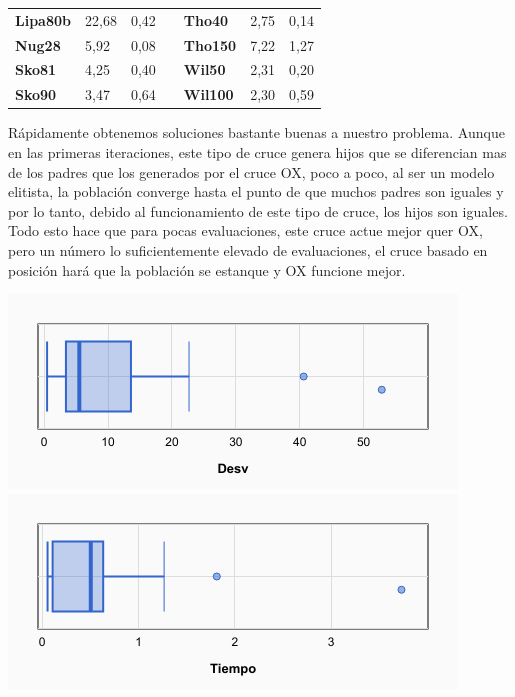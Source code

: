 \documentclass[a4paper, 12pt]{article}
\begin{document}
\begin{table}[H]
\begin{tabular}{|l|l|l|l|l|l|l|}
\textbf{Lipa80b}                    & 22,68                     & 0,42                        &                       & \textbf{Tho40}                     & 2,75                      & 0,14                        \\ \cline{1-3} \cline{5-7} 
\textbf{Nug28}                      & 5,92                      & 0,08                        &                       & \textbf{Tho150}                    & 7,22                      & 1,27                        \\ \cline{1-3} \cline{5-7} 
\textbf{Sko81}                      & 4,25                      & 0,40                        &                       & \textbf{Wil50}                     & 2,31                      & 0,20                        \\ \cline{1-3} \cline{5-7} 
\textbf{Sko90}                      & 3,47                      & 0,64                        &                       & \textbf{Wil100}                    & 2,30                      & 0,59                        \\ \cline{1-3} \cline{5-7} 
\end{tabular}
\end{table}

	Rápidamente obtenemos soluciones bastante buenas a nuestro problema. Aunque en las primeras iteraciones, este tipo de cruce genera hijos que se diferencian mas de los padres que los generados por el cruce OX, poco a poco, al ser un modelo elitista, la población converge hasta el punto de que muchos padres son iguales y por lo tanto, debido al funcionamiento de este tipo de cruce, los hijos son iguales. Todo esto hace que para pocas evaluaciones, este cruce actue mejor quer OX, pero un número lo suficientemente elevado de evaluaciones, el cruce basado en posición hará que la población se estanque y OX funcione mejor.

	\begin{center}
         \includegraphics[scale=0.5]{boxplot-aggpos-desv}
         \includegraphics[scale=0.5]{boxplot-aggpos-time}
      \end{center}
\end{document}
